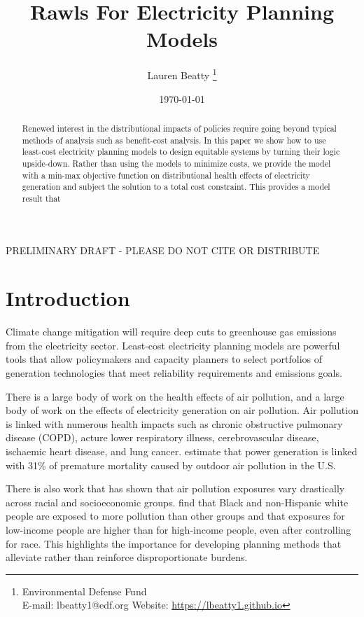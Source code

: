 \documentclass[a4paper]{article}
\title{Rawls For Electricity Planning Models}
\author{Lauren Beatty \thanks{Environmental Defense Fund\\  E-mail: lbeatty1@edf.org \hspace{.5cm}Website: \href{https://lbeatty1.github.io}{https://lbeatty1.github.io}}}
\date{\today}
\theoremstyle{definition}
\theoremstyle{plain}
\begin{document}
\maketitle
\begin{center}
    PRELIMINARY DRAFT - PLEASE DO NOT CITE OR DISTRIBUTE
\end{center}

\begin{abstract}
Renewed interest in the distributional impacts of policies require going beyond typical methods of analysis such as benefit-cost analysis.  In this paper we show how to use least-cost electricity planning models to design equitable systems by turning their logic upside-down.  Rather than using the models to minimize costs, we provide the model with a min-max objective function on distributional health effects of electricity generation and subject the solution to a total cost constraint.  This provides a model result that 
\end{abstract}


\newpage
\section{Introduction}
Climate change mitigation will require deep cuts to greenhouse gas emissions from the electricity sector.  Least-cost electricity planning models are powerful tools that allow policymakers and capacity planners to select portfolios of generation technologies that meet reliability requirements and emissions goals.  

There is a large body of work on the health effects of air pollution, and a large body of work on the effects of electricity generation on air pollution. 
Air pollution is linked with numerous health impacts such as chronic obstructive pulmonary disease (COPD), acture lower respiratory illness, cerebrovascular disease, ischaemic heart disease, and lung cancer. \cite{Lelieveld2015TheScale} estimate that power generation is linked with 31$\%$ of premature mortality caused by outdoor air pollution in the U.S.

There is also work that has shown that air pollution exposures vary drastically across racial and socioeconomic groups.   \cite{Thind2019FineGeography} find that Black and non-Hispanic white people are exposed to more pollution than other groups and that exposures for low-income people are higher than for high-income people, even after controlling for race.  This highlights the importance for developing planning methods that alleviate rather than reinforce disproportionate burdens.
\end{document}
